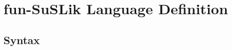\documentclass[10pt]{article}
\begin{document}
%
%
%
%
%
%
%

\section{fun-SuSLik Language Definition}
\label{sec:FSDef}
\subsection{Syntax}
\end{document}
